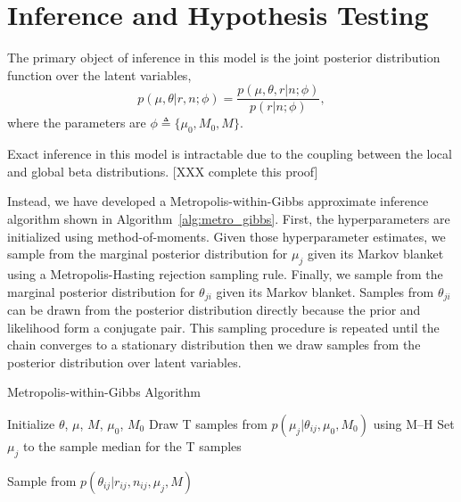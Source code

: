\documentclass[11pt,reqno]{amsart}
\begin{document}
\section{Inference and Hypothesis Testing}

The primary object of inference in this model is the joint posterior distribution function over the latent variables,
\begin{equation}
	p(\mu, \theta | r, n; \phi)  = \frac{ p(\mu, \theta, r | n; \phi) } {p ( r | n; \phi)},
\end{equation}
where the parameters are $\phi \triangleq \{\mu_0, M_0, M\}$.

Exact inference in this model is intractable due to the coupling between the local and global beta distributions. [XXX complete this proof] 

Instead, we have developed a Metropolis-within-Gibbs  approximate inference algorithm shown in Algorithm~\ref{alg:metro_gibbs}. First, the hyperparameters are initialized using method-of-moments. Given those hyperparameter estimates, we sample from the marginal posterior distribution for $\mu_j$ given its Markov blanket using a Metropolis-Hasting rejection sampling rule. Finally, we sample from the marginal posterior distribution for $\theta_{ji}$ given its Markov blanket. Samples from $\theta_{ji}$ can be drawn from the posterior distribution directly  because the prior and likelihood form a conjugate pair. This sampling procedure is repeated until the chain converges to a stationary distribution then we draw samples from the posterior distribution over latent variables.

\begin{algorithm}[ht]
\caption{Metropolis-within-Gibbs Algorithm}
\label{alg:metro_gibbs}
\begin{algorithmic}[1]

\State Initialize $\theta$, $\mu$, $M$, $\mu_0$, $M_0$
\Repeat
{} 
  \State Draw T samples from $p \left( \mu_j |\theta_{ij},\mu_0,M_0\right)$ using M--H
  \State Set $\mu_j$ to the sample median for the T samples
  
  
   
	\State Sample from $p \left( \theta_{ij} |r_{ij},n_{ij},\mu_j,M \right)$
  \EndFor

\EndFor
{}
\end{algorithmic}
\end{algorithm}

\end{document}
